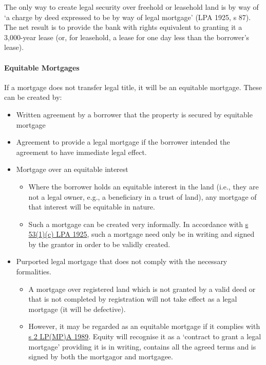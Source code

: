 \documentclass[
]{article}
\providecommand{\tightlist}{%
  \setlength{\itemsep}{0pt}\setlength{\parskip}{0pt}}
\begin{document}
The only way to create legal security over freehold or leasehold land is
by way of `a charge by deed expressed to be by way of legal mortgage'
(LPA 1925, s 87). The net result is to provide the bank with rights
equivalent to granting it a 3,000-year lease (or, for leasehold, a lease
for one day less than the borrower's lease).

\hypertarget{equitable-mortgages}{%
\paragraph{Equitable Mortgages}\label{equitable-mortgages}}

If a mortgage does not transfer legal title, it will be an equitable
mortgage. These can be created by:

\begin{itemize}
\tightlist
\item
  Written agreement by a borrower that the property is secured by
  equitable mortgage
\item
  Agreement to provide a legal mortgage if the borrower intended the
  agreement to have immediate legal effect.
\item
  Mortgage over an equitable interest

  \begin{itemize}
  \tightlist
  \item
    Where the borrower holds an equitable interest in the land (i.e.,
    they are not a legal owner, e.g., a beneficiary in a trust of land),
    any mortgage of that interest will be equitable in nature.
  \item
    Such a mortgage can be created very informally. In accordance with
    \href{https://www.legislation.gov.uk/ukpga/Geo5/15-16/20/section/53}{s
    53(1)(c) LPA 1925}, such a mortgage need only be in writing and
    signed by the grantor in order to be validly created.
  \end{itemize}
\item
  Purported legal mortgage that does not comply with the necessary
  formalities.

  \begin{itemize}
  \tightlist
  \item
    A mortgage over registered land which is not granted by a valid deed
    or that is not completed by registration will not take effect as a
    legal mortgage (it will be defective).
  \item
    However, it may be regarded as an equitable mortgage if it complies
    with \href{https://www.legislation.gov.uk/ukpga/1989/34/section/2}{s
    2 LP(MP)A 1989}. Equity will recognise it as a `contract to grant a
    legal mortgage' providing it is in writing, contains all the agreed
    terms and is signed by both the mortgagor and mortgagee.
  \end{itemize}
\end{itemize}
\end{document}
